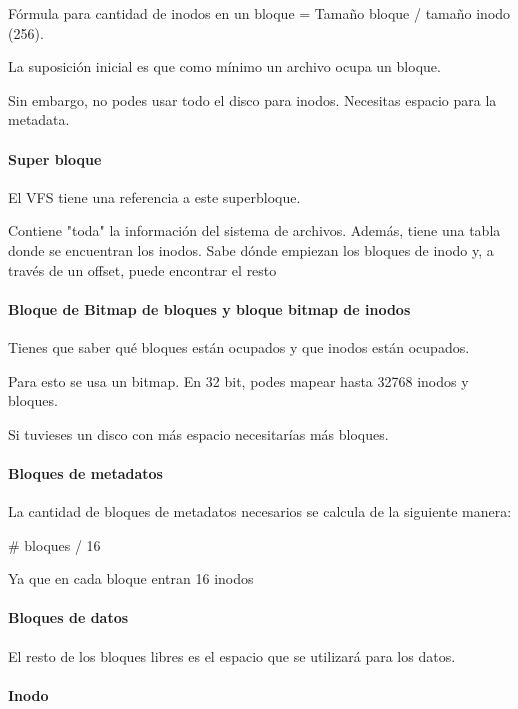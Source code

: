 \documentclass{article}
\begin{document}
Fórmula para cantidad de inodos en un bloque = Tamaño bloque / tamaño
inodo (256).

La suposición inicial es que como mínimo un archivo ocupa un bloque.

Sin embargo, no podes usar todo el disco para inodos. Necesitas espacio
para la metadata.

\paragraph{Super bloque}\label{super-bloque}

El VFS tiene una referencia a este superbloque.

Contiene "toda" la información del sistema de archivos. Además, tiene
una tabla donde se encuentran los inodos. Sabe dónde empiezan los
bloques de inodo y, a través de un offset, puede encontrar el resto

\paragraph{Bloque de Bitmap de bloques y bloque bitmap de
inodos}\label{bloque-de-bitmap-de-bloques-y-bloque-bitmap-de-inodos}

Tienes que saber qué bloques están ocupados y que inodos están ocupados.

Para esto se usa un bitmap. En 32 bit, podes mapear hasta 32768 inodos y
bloques.

Si tuvieses un disco con más espacio necesitarías más bloques.

\paragraph{Bloques de metadatos}\label{bloques-de-metadatos}

La cantidad de bloques de metadatos necesarios se calcula de la
siguiente manera:

\# bloques / 16

Ya que en cada bloque entran 16 inodos

\paragraph{Bloques de datos}\label{bloques-de-datos}

El resto de los bloques libres es el espacio que se utilizará para los
datos.

\paragraph{Inodo}\label{inodo}
\end{document}

